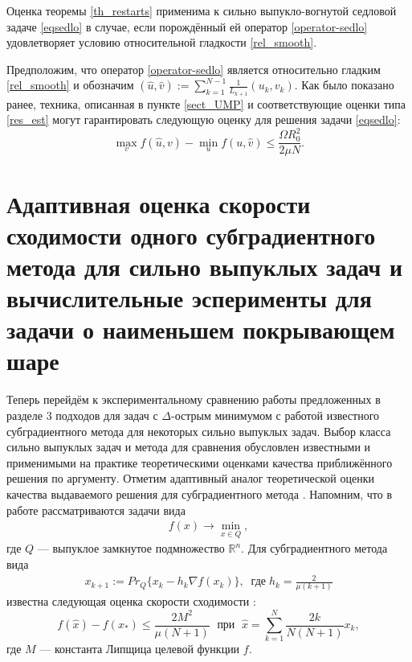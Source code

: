 \begin{remark}
Оценка теоремы \ref{th_restarts} применима к сильно выпукло-вогнутой седловой задаче \eqref{eqsedlo} в случае, если порождённый ей оператор \eqref{operator-sedlo} удовлетворяет условию относительной гладкости \eqref{rel_smooth}.
\end{remark}


\begin{remark}
Предположим, что оператор \eqref{operator-sedlo} является относительно гладким \eqref{rel_smooth} и обозначим $(\widehat{u}, \widehat{v}) :=  \sum_{k=1}^{N-1} \frac{1}{L_{k+1}} (u_k,v_k)$. Как было показано ранее, техника, описанная в пункте \ref{sect_UMP} и соответствующие оценки типа \eqref{res_est} могут гарантировать следующую оценку для решения задачи \eqref{eqsedlo}:
\begin{equation}
\max_{v} f(\widehat{u}, v) - \min_{u} f(u, \widehat{v}) \leq \frac{\Omega R_{0}^{2}}{ 2\mu N}.
\end{equation}
\end{remark}
\fi

\section{Адаптивная оценка скорости сходимости одного субградиентного метода для сильно выпуклых задач и вычислительные эсперименты для задачи о наименьшем покрывающем шаре}

Теперь перейдём к экспериментальному сравнению работы предложенных в разделе 3 подходов для задач с $\Delta$-острым минимумом с работой известного субградиентного метода \cite{Bach_2012} для некоторых сильно выпуклых задач. Выбор класса сильно выпуклых задач и метода \cite{Bach_2012} для сравнения обусловлен известными и  применимыми на практике теоретическими оценками качества приближённого решения по аргументу. Отметим адаптивный аналог \cite{Stonyakin_2021} теоретической оценки качества выдаваемого решения для субградиентного метода \cite{Bach_2012}. Напомним, что в работе рассматриваются задачи вида
\begin{gather}\label{min_q}
f(x)\rightarrow\min_{x\in Q},
\end{gather}
где $Q$ --- выпуклое замкнутое подмножество $\mathbb{R}^{n}$. Для субградиентного метода вида
\begin{gather}\label{orig}
x_{k+1} := Pr_{Q}\{x_k - h_k \nabla f(x_k) \}, \;\; \textit{где} \; h_k = \frac{2}{\mu (k+1)}
\end{gather}
известна следующая оценка скорости сходимости \cite{Bach_2012}:
\begin{equation}\label{orig_estimation_f}
f(\widehat{x}) - f(x_*) \leq \frac{2 M^2}{\mu (N+1)}  \; \text{  при   } \; \widehat{x} = \sum\limits_{k=1}^{N} \frac{2 k}{N (N+1)} x_k, 
\end{equation}
где $M$ --- константа Липщица целевой функции $f$.

